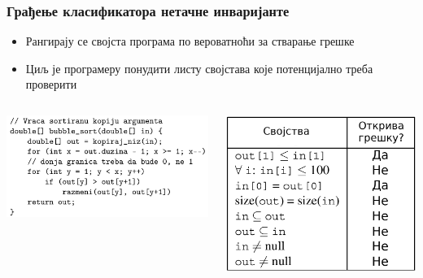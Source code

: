\documentclass{beamer}
\begin{document}
\begin{frame}
\frametitle{Грађење класификатора нетачне инваријанте}
\begin{itemize}
    \item Рангирају се својста програма по вероватноћи за стварање грешке
    \item Циљ је програмеру понудити листу својстава које потенцијално треба проверити
\end{itemize}

\begin{columns}
\begin{column}{0.55\textwidth}
    \begin{center}
		\includegraphics[scale=0.15]{./slike/latent_code2.png}
    \end{center}
\end{column}
\begin{column}{0.45\textwidth}  %
	\begin{center}
		\includegraphics[scale=0.13]{./slike/latent_examples.png}
	\end{center}
\end{column}
\end{columns}


\end{frame}
\end{document}
